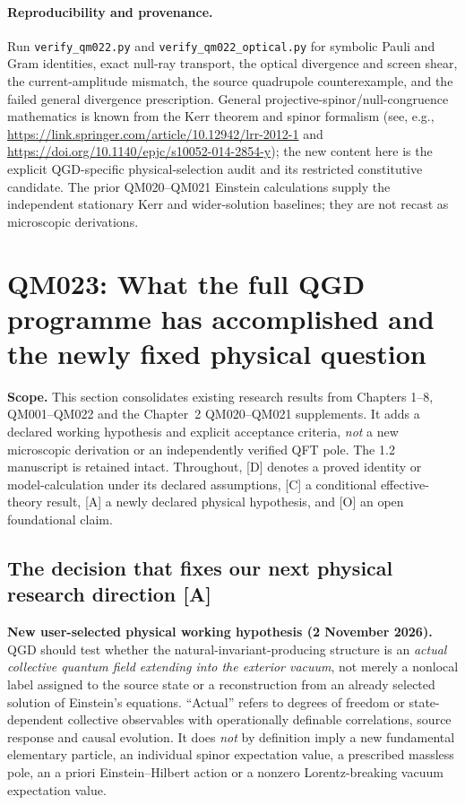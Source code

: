 \documentclass[11pt,a4paper]{article}
\begin{document}
\paragraph{Reproducibility and provenance.} Run \texttt{verify\_qm022.py} and \texttt{verify\_qm022\_optical.py} for symbolic Pauli and Gram identities, exact null-ray transport, the optical divergence and screen shear, the current-amplitude mismatch, the source quadrupole counterexample, and the failed general divergence prescription. General projective-spinor/null-congruence mathematics is known from the Kerr theorem and spinor formalism (see, e.g., \url{https://link.springer.com/article/10.12942/lrr-2012-1} and \url{https://doi.org/10.1140/epjc/s10052-014-2854-y}); the new content here is the explicit QGD-specific physical-selection audit and its restricted constitutive candidate. The prior QM020--QM021 Einstein calculations supply the independent stationary Kerr and wider-solution baselines; they are not recast as microscopic derivations.

\clearpage
\section{QM023: What the full QGD programme has accomplished and the newly fixed physical question}
\label{sec:v13-qm023}
\noindent\textbf{Scope.} This section consolidates existing research results from Chapters 1--8, QM001--QM022 and the Chapter~2 QM020--QM021 supplements. It adds a declared working hypothesis and explicit acceptance criteria, \emph{not} a new microscopic derivation or an independently verified QFT pole. The 1.2 manuscript is retained intact. Throughout, [D] denotes a proved identity or model-calculation under its declared assumptions, [C] a conditional effective-theory result, [A] a newly declared physical hypothesis, and [O] an open foundational claim.

\subsection{The decision that fixes our next physical research direction [A]}
\label{sec:v13-field-commitment}
\textbf{New user-selected physical working hypothesis (2 November 2026).} QGD should test whether the natural-invariant-producing structure is an \emph{actual collective quantum field extending into the exterior vacuum}, not merely a nonlocal label assigned to the source state or a reconstruction from an already selected solution of Einstein's equations. ``Actual'' refers to degrees of freedom or state-dependent collective observables with operationally definable correlations, source response and causal evolution. It does \emph{not} by definition imply a new fundamental elementary particle, an individual spinor expectation value, a prescribed massless pole, an a priori Einstein--Hilbert action or a nonzero Lorentz-breaking vacuum expectation value.
\end{document}
